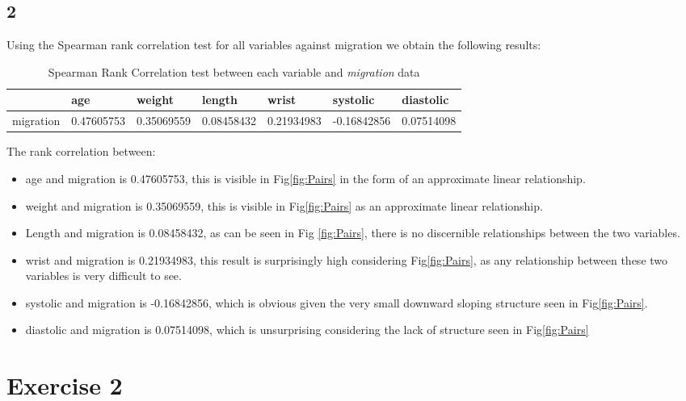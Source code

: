 \documentclass{article}
\begin{document}
    \subsection*{2}
    Using the Spearman rank correlation test for all variables against migration we obtain the following results:
	\begin{table}
    \begin{center}
    \begin{tabular}{l|llllll}
        \hline 
        & age & weight & length & wrist & systolic & diastolic \\
        \hline
        migration &0.47605753 & 0.35069559 & 0.08458432 & 0.21934983 & -0.16842856 & 0.07514098 \\
        \hline
    \end{tabular}
    \caption{Spearman Rank Correlation test between each variable and \textit{migration} data}
    \label{table:rankcorr}
    \end{center}
    \end{table}
    
    
    The rank correlation between:
    \begin{itemize}
    \item age and migration is 0.47605753, this is visible in Fig\ref{fig:Pairs} in the form of an approximate linear relationship.
    \item weight and migration is 0.35069559, this is visible in Fig\ref{fig:Pairs} as an approximate linear relationship.
    \item Length and migration is 0.08458432, as can be seen in Fig \ref{fig:Pairs}, there is no discernible relationships between the two variables.
    \item wrist and migration is 0.21934983, this result is surprisingly high considering Fig\ref{fig:Pairs}, as any relationship between these two variables is very difficult to see.
    \item systolic and migration is -0.16842856, which is obvious given the very small downward sloping structure seen in Fig\ref{fig:Pairs}.
    \item diastolic and migration is 0.07514098, which is unsurprising considering the lack of structure seen in Fig\ref{fig:Pairs}
    \end{itemize}
    
    \section{Exercise 2}
\end{document}
